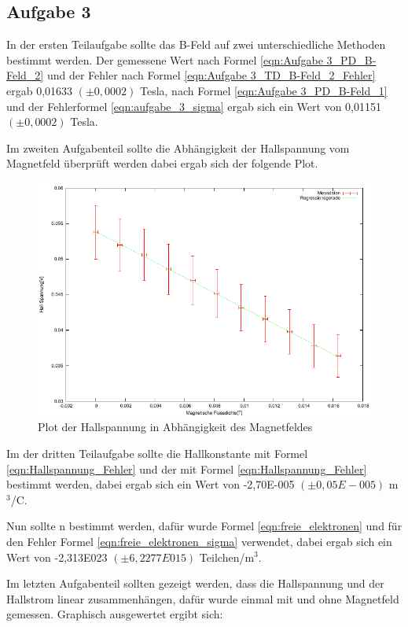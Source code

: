 \documentclass[12pt]{scrartcl}
\begin{document}
\subsection{Aufgabe 3}
In der ersten Teilaufgabe sollte das B-Feld auf zwei unterschiedliche Methoden bestimmt werden.
Der gemessene Wert nach Formel \ref{eqn:Aufgabe 3_PD_B-Feld_2} und der Fehler nach Formel \ref{eqn:Aufgabe 3_TD_B-Feld_2_Fehler} ergab 0,01633 $(\pm 0,0002)$ Tesla, nach Formel \ref{eqn:Aufgabe 3_PD_B-Feld_1} und der Fehlerformel \ref{eqn:aufgabe_3_sigma} ergab sich ein Wert von 0,01151 $(\pm 0,0002)$ Tesla.

Im zweiten Aufgabenteil sollte die Abhängigkeit der Hallspannung vom Magnetfeld überprüft werden dabei ergab sich der folgende Plot.

\begin{figure}[htbp] 
  \centering
    \includegraphics[scale = 1.3]{aufgabe_3_b.pdf}
  	\caption[Plot der Hallspannung in Abhängigkeit des Magnetfeldes]{Plot der Hallspannung in Abhängigkeit des Magnetfeldes}
  \label{fig:kasten}
\end{figure}

Im der dritten Teilaufgabe sollte die Hallkonstante mit Formel \ref{eqn:Hallspannung_Fehler} und der mit Formel \ref{eqn:Hallspannung_Fehler} bestimmt werden, dabei ergab sich ein Wert von -2,70E-005 $(\pm 0,05E-005)$ m$^3$/C.

Nun sollte n bestimmt werden, dafür wurde Formel \ref{eqn:freie_elektronen} und für den Fehler Formel \ref{eqn:freie_elektronen_sigma} verwendet, dabei ergab sich ein Wert von -2,313E023 $(\pm 6,2277E015)$ Teilchen/m$^3$.

Im letzten Aufgabenteil sollten gezeigt werden, dass die Hallspannung und der Hallstrom linear zusammenhängen, dafür wurde einmal mit und ohne Magnetfeld gemessen.
Graphisch ausgewertet ergibt sich:
\end{document}
